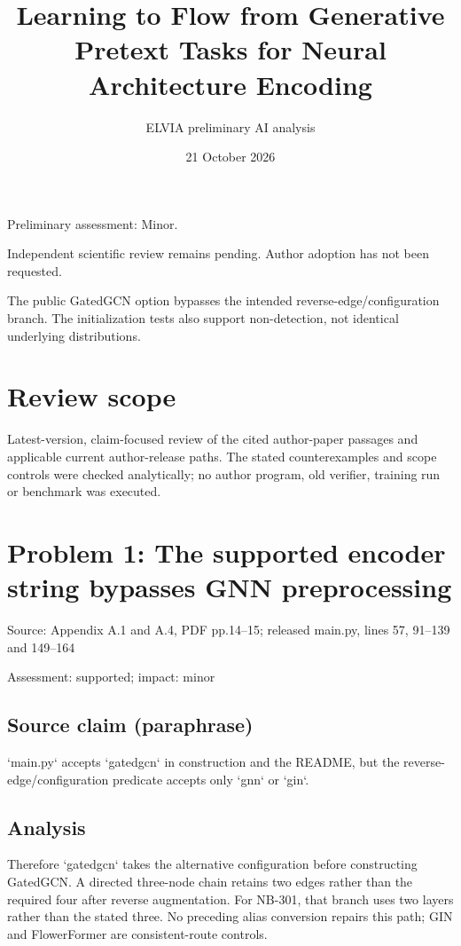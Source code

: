 \documentclass[11pt]{article}
\begin{document}
\title{Learning to Flow from Generative Pretext Tasks for Neural Architecture Encoding}

\author{ELVIA preliminary AI analysis}\date{21 October 2026}\maketitle

Preliminary assessment: Minor.\par

Independent scientific review remains pending. Author adoption has not been requested.

The public GatedGCN option bypasses the intended reverse-edge/configuration branch. The initialization tests also support non-detection, not identical underlying distributions.

\section*{Review scope}

Latest-version, claim-focused review of the cited author-paper passages and applicable current author-release paths. The stated counterexamples and scope controls were checked analytically; no author program, old verifier, training run or benchmark was executed.

\section*{Problem 1: The supported encoder string bypasses GNN preprocessing}

Source: Appendix A.1 and A.4, PDF pp.14–15; released main.py, lines 57, 91–139 and 149–164

Assessment: supported; impact: minor

\subsection*{Source claim (paraphrase)}

`main.py` accepts `gatedgcn` in construction and the README, but the reverse-edge/configuration predicate accepts only `gnn` or `gin`.

\subsection*{Analysis}

Therefore `gatedgcn` takes the alternative configuration before constructing GatedGCN. A directed three-node chain retains two edges rather than the required four after reverse augmentation. For NB-301, that branch uses two layers rather than the stated three. No preceding alias conversion repairs this path; GIN and FlowerFormer are consistent-route controls.
\end{document}
